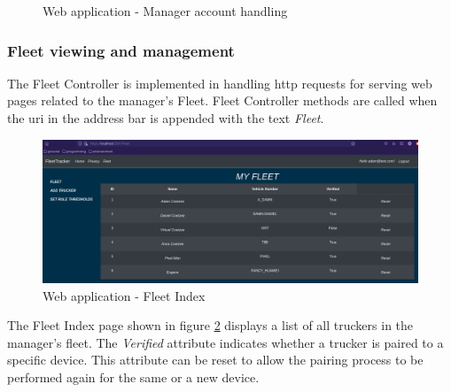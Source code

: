 \begin{figure}[H]
\centering
\caption{Web application - Manager account handling}
\label{fig:webapp_userhandling}
\end{figure}

\pagebreak
\subsubsection{Fleet viewing and management}
The Fleet Controller is implemented in handling \Ac{http} requests for serving web pages related to the manager's Fleet.
Fleet Controller methods are called when the \ac{uri} in the address bar is appended with the text \textit{Fleet}.

\begin{figure}[H]
\centering
\includegraphics[width=6in]{webapp_fleet_index.png}
\caption{Web application - Fleet Index}
\label{fig:webapp_fleet_index}
\end{figure}
The Fleet Index page shown in figure \ref{fig:webapp_fleet_index} displays a list of all truckers in the manager's fleet.
The \textit{Verified} attribute indicates whether a trucker is paired to a specific device.
This attribute can be reset to allow the pairing process to be performed again for the same or a new device.

